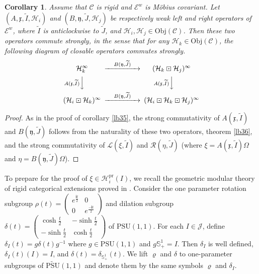 \documentclass[11pt,b5paper,notitlepage]{article}
\theoremstyle{definition}
\theoremstyle{plain}
\newtheorem{co}[df]{Corollary}
\newcommand{\fk}{\mathfrak}
\newcommand{\mc}{\mathcal}
\newcommand{\wtd}{\widetilde}
\newcommand{\PSU}{\mathrm{PSU}(1,1)}
\newcommand{\UPSU}{\widetilde{\mathrm{PSU}}(1,1)}
\newcommand{\scr}{\mathscr}
\newcommand{\im}{\mathbf{i}}
\newcommand{\mbb}{\mathbb}
\newcommand{\Obj}{\mathrm{Obj}}
\newcommand{\pr}{\mathrm{pr}}
\numberwithin{equation}{subsection}
\begin{document}
\begin{co}\label{lb41}
Assume that $\scr C$ is rigid and $\scr E^w$ is M\"obius covariant. Let $(A,\fk x,\wtd I,\mc H_i)$ and $(B,\fk y,\wtd J,\mc H_j)$ be respectively weak left and right operators of $\scr E^w$, where $\wtd I$ is anticlockwise to $\wtd J$, and $\mc H_i,\mc H_j\in\Obj(\scr C)$. Then these two operators commute strongly, in the sense that for any $\mc H_k\in\Obj(\scr C)$, the following diagram of closable operators commutes strongly.
\begin{align}
\begin{CD}
\mc H_k^\infty @> \quad B(\fk y,\wtd J)\quad   >> (\mc H_k\boxdot\mc H_j)^\infty\\
@V A(\fk x,\wtd I)   V  V @V A(\fk x,\wtd I) VV\\
(\mc H_i\boxdot\mc H_k)^\infty @> \quad B(\fk y,\wtd J) \quad  >> (\mc H_i\boxdot\mc H_k\boxdot\mc H_j)^\infty
\end{CD}
\end{align}
\end{co}

\begin{proof}
As in the proof of corollary \ref{lb35}, the strong commutativity of $A(\fk x,\wtd I)$ and $B(\fk y,\wtd J)$ follows from the naturality of these two operators, theorem \ref{lb36}, and the strong commutativity of $\scr L(\xi,\wtd I)$ and $\scr R(\eta,\wtd J)$ (where $\xi=A(\fk x,\wtd I)\Omega$ and $\eta=B(\fk y,\wtd J)\Omega$).
\end{proof}


To prepare for the proof of $\xi\in\mc H_i^\pr(I)$, we recall the geometric modular theory of rigid categorical extensions proved in \cite{Gui21b}. Consider the one parameter rotation subgroup  $\rho(t)=\left( \begin{array}{cc}
e^{\frac{\im t}2} & 0 \\
0 &e^{\frac{-\im t}2}
\end{array} \right)$ and dilation subgroup $\delta(t)=\left( \begin{array}{cc}
\cosh\frac t2 & -\sinh\frac t2 \\
-\sinh\frac t2 &\cosh\frac t2
\end{array} \right)$ of $\PSU$. For each $I\in\mc J$, define $\delta_I(t)=g\delta(t)g^{-1}$ where $g\in\PSU$ and $g\mbb S^1_+=I$. Then $\delta_I$ is well defined, $\delta_I(t)(I)=I$, and $\delta(t)=\delta_{\mbb S^1_+}(t)$. We lift $\varrho$ and $\delta$ to one-parameter subgroups of $\UPSU$ and denote them by the same symbols $\varrho$ and $\delta_I$.
\end{document}
